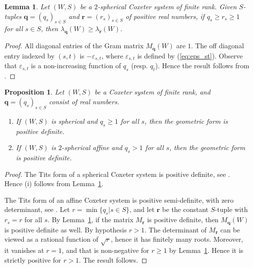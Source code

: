 \documentclass[12pt,a4paper]{amsproc}
\newtheorem{proposition}[theorem]{Proposition}
\newtheorem{lemma}[theorem]{Lemma}
\theoremstyle{definition}
\newcommand{\qq}{\mathbf q}
\begin{document}
\begin{lemma}\label{lem:compare}
Let $(W, S)$ be a $2$-spherical Coxeter system of finite rank. Given  $S$-tuples $\qq= (q_s)_{s \in S}$ and $\mathbf r = (r_s)_{s \in S}$ of positive real numbers, if $q_s \geq r_s\geq 1$ for all $s \in S$, then  $\lambda_\qq(W) \geq \lambda_{\mathbf r}(W)$.  
\end{lemma}
\begin{proof}
All diagonal entries of the Gram matrix $M_\qq(W)$ are $1$. The off diagonal entry indexed by $(s,t)$ is $-\varepsilon_{s, t}$, where $\varepsilon_{s, t}$ is   defined by (\ref{eq:eps_st}). Observe that $\varepsilon_{s, t}$ is a non-increasing function of $q_s$ (resp. $q_t$). Hence the result follows from \cite[Proposition~2.9]{GriOpp}.
\end{proof}
	
	
\begin{proposition}\label{prop:spherical-affine}
Let $(W, S)$ be a Coxeter system of finite rank, and  $\qq= (q_s)_{s \in S}$ consist of real numbers.
\begin{enumerate}[label=(\roman*)]
\item If $(W, S)$ is spherical  and $q_s \geq 1$ for all $s$, then the geometric form is positive definite. 

\item If $(W, S)$ is  $2$-spherical affine  and $q_s > 1$ for all $s$, then the geometric form is positive definite. 
\end{enumerate}
	
\end{proposition}
\begin{proof}
 The Tits form of a spherical Coxeter system is positive definite, see \cite[Ch.~V, \S4.8]{Bour}. Hence (i) follows from Lemma~\ref{lem:compare}. 
 
 The Tits form of an   affine Coxeter system is positive semi-definite, with zero determinant,  see \cite[Ch.~V, \S4.9]{Bour}. Let $r = \min\{q_s |s \in S\}$, and let $\mathbf r$ be the constant $S$-tuple with $r_s =r$ for all $s$. By Lemma~\ref{lem:compare}, if the matrix $M_{\mathbf r}$  is positive definite, then $M_\qq(W)$ is positive definite as well. By hypothesis $r> 1$. The determinant of  $M_{\mathbf r}$ can be viewed as a rational function of $\sqrt r$, hence it has finitely many roots. Moreover, it vanishes at $r=1$, and that is non-negative for $r \geq 1$ by Lemma~\ref{lem:compare}. Hence it is strictly positive for $r>1$. The result follows. 
\end{proof}
\end{document}
